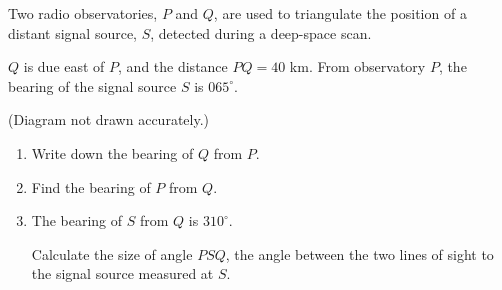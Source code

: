 \begin{question}
\noindent Two radio observatories, $P$ and $Q$, are used to triangulate the position of a distant signal source, $S$, detected during a deep-space scan.

$Q$ is due east of $P$, and the distance $PQ = 40$ km.
From observatory $P$, the bearing of the signal source $S$ is $065^\circ$.

\begin{center}
\end{center}

\noindent (Diagram not drawn accurately.)

\begin{enumerate}
    \item[(a)] Write down the bearing of $Q$ from $P$.

    \vspace{2.5cm}

    \item[(b)] Find the bearing of $P$ from $Q$.

    \vspace{3cm}

    \item[(c)] The bearing of $S$ from $Q$ is $310^\circ$.

    Calculate the size of angle $PSQ$, the angle between the two lines of sight to the signal source measured at $S$.

    \vspace{5cm}
\end{enumerate}
\end{question}
